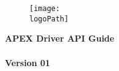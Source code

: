 \documentclass[oneside]{book}
\newcommand{\docTitleLineOne}{APEX Driver API Guide} %
\newcommand{\docTitleLineTwo}{}          %
\newcommand{\docID}{Version 01}          %
\newcommand{\logoPath}{../../../../../script/doxygen/NXP_logo_RGB_512x960.pdf}   %
\newcommand{\+}{\discretionary{\mbox{\scriptsize$\hookleftarrow$}}{}{}}
\begin{document}
\pagestyle{empty} %

\begin{figure}
	\centering
	\texttt{[image: \\logoPath]}
\end{figure}

\vspace*{2.5cm}
\begin{flushright}
	\Huge
	\textbf{ \docTitleLineOne} \vspace*{0.4cm} \\ 
	\textbf{ \docTitleLineTwo} \\
	\huge
	\vspace*{2.0cm}
	\textbf{\docID}
\end{flushright}
\vspace*{2.4cm}
\end{document}
